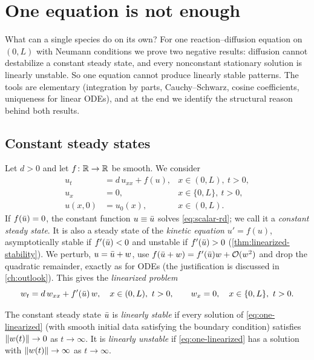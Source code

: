 \chapter{One equation is not enough}\label{ch:one-equation}

What can a single species do on its own? For one reaction--diffusion equation on
$(0,L)$ with Neumann conditions we prove two negative results: diffusion cannot
destabilize a constant steady state, and every nonconstant stationary solution is
linearly unstable. So one equation cannot produce linearly stable patterns. The tools
are elementary (integration by parts, Cauchy--Schwarz, cosine coefficients,
uniqueness for linear ODEs), and at the end we identify the structural reason behind
both results.

\section{Constant steady states}\label{sec:one-constant}

Let $d>0$ and let $f\colon\mathbb{R}\to\mathbb{R}$ be smooth. We consider
\begin{equation}\label{eq:scalar-rd}
\begin{aligned}
  u_t &= d\,u_{xx} + f(u), & x\in(0,L),\ t>0,\\
  u_x &= 0, & x\in\{0,L\},\ t>0,\\
  u(x,0) &= u_0(x), & x\in(0,L).
\end{aligned}
\end{equation}
If $f(\bar u)=0$, the constant function $u\equiv\bar u$ solves \eqref{eq:scalar-rd}; we call
it a \emph{constant steady state}. It is also a steady state of the \emph{kinetic
equation} $u'=f(u)$, asymptotically stable if $f'(\bar u)<0$ and unstable if
$f'(\bar u)>0$ (\cref{thm:linearized-stability}). We perturb, $u=\bar u+w$, use
$f(\bar u+w)=f'(\bar u)w+\mathcal{O}(w^2)$ and drop the quadratic remainder, exactly as for
ODEs (the justification is discussed in \cref{ch:outlook}). This gives the
\emph{linearized problem}
\begin{equation}\label{eq:one-linearized}
  w_t = d\,w_{xx} + f'(\bar u)\,w,\quad x\in(0,L),\ t>0,\qquad
  w_x = 0,\quad x\in\{0,L\},\ t>0 .
\end{equation}

\begin{definition}\label{def:linear-stability-scalar}
The constant steady state $\bar u$ is \emph{linearly stable} if every solution of
\eqref{eq:one-linearized} (with smooth initial data satisfying the boundary
condition) satisfies $\left\lVert w(t)\right\rVert\to0$ as $t\to\infty$. It is \emph{linearly
unstable} if \eqref{eq:one-linearized} has a solution with $\left\lVert w(t)\right\rVert\to\infty$
as $t\to\infty$.
\end{definition}

